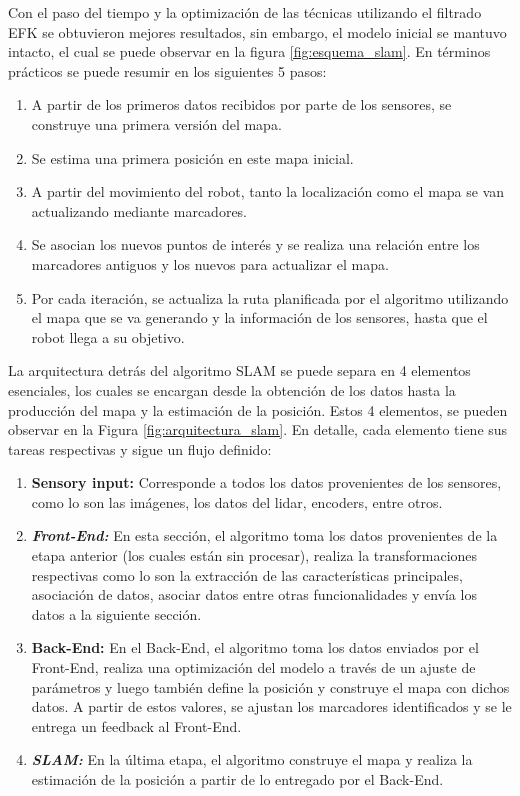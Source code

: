 Con el paso del tiempo y la optimización de las técnicas utilizando el filtrado EFK se obtuvieron mejores resultados, sin embargo, el modelo inicial se mantuvo intacto, el cual se puede observar en la figura \ref{fig:esquema_slam}. En términos prácticos se puede resumir en los siguientes 5 pasos: 
\begin{enumerate}
    \item A partir de los primeros datos recibidos por parte de los sensores, se construye una primera versión del mapa.
    \item Se estima una primera posición en este mapa inicial.
    \item A partir del movimiento del robot, tanto la localización como el mapa se van actualizando mediante marcadores.
    \item Se asocian los nuevos puntos de interés y se realiza una relación entre los marcadores antiguos y los nuevos para actualizar el mapa.
    \item Por cada iteración, se actualiza la ruta planificada por el algoritmo utilizando el mapa que se va generando y la información de los sensores, hasta que el robot llega a su objetivo.
\end{enumerate}

La arquitectura detrás del algoritmo SLAM se puede separa en 4 elementos esenciales, los cuales se encargan desde la obtención de los datos hasta la producción del mapa y la estimación de la posición. Estos 4 elementos, se pueden observar en la Figura \ref{fig:arquitectura_slam}. En detalle, cada elemento tiene sus tareas respectivas y sigue un flujo definido:
\begin{enumerate}
    \item \textbf{\textbf{Sensory input: }} Corresponde a todos los datos provenientes de los sensores, como lo son las imágenes, los datos del lidar, encoders, entre otros.
    \item \textbf{\textit{Front-End: }} En esta sección, el algoritmo toma los datos provenientes de la etapa anterior (los cuales están sin procesar), realiza la transformaciones respectivas como lo son la extracción de las características principales, asociación de datos, asociar datos entre otras funcionalidades y envía los datos a la siguiente sección.
    \item \textbf{\textbf{Back-End: }} En el Back-End, el algoritmo toma los datos enviados por el Front-End, realiza una optimización del modelo a través de un ajuste de parámetros y luego también define la posición y construye el mapa con dichos datos. A partir de estos valores, se ajustan los marcadores identificados y se le entrega un feedback al Front-End.
    \item \textbf{\textit{SLAM: }} En la última etapa, el algoritmo construye el mapa y realiza la estimación de la posición a partir de lo entregado por el Back-End.
\end{enumerate}

